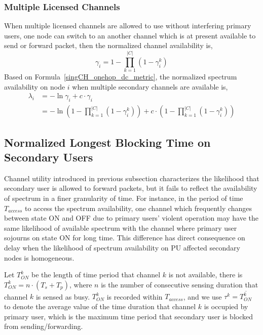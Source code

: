\subsubsection{Multiple Licensed Channels}
When multiple licensed channels are allowed to use without interfering primary users, one node can switch to an another channel which is at present available to send or forward packet, then the normalized channel availability is,
\begin{equation}
\gamma_i = 1-\prod_{k=1}^{|C|} (1-\gamma_i^k)
\label{gamma_multichannel}
\end{equation} 
Based on Formula~\ref{singCH_onehop_dc_metric}, the normalized spectrum availability on node $i$ when multiple secondary channels are available is,
\begin{equation}
\label{mulCH_onehop_dc_metric}
\begin{aligned}
\lambda_i & = -\ln \gamma_i+ c \cdot \gamma_i\\
		&= -\ln(1-\prod_{k=1}^{|C|}(1-\gamma_i^k)) + c \cdot (1-\prod_{k=1}^{|C|}(1-\gamma_i^k))
\end{aligned}
\end{equation}


\subsection{Normalized Longest Blocking Time on Secondary Users}
\label{BT}
Channel utility introduced in previous subsection characterizes the likelihood that secondary user is allowed to forward packets, but it fails to reflect the availability of spectrum in a finer granularity of time.
For instance, in the period of time $T_{access}$ to access the spectrum availability, one channel which frequently changes between state ON and OFF due to primary users' violent operation may have the same likelihood of available spectrum with the channel where primary user sojourns on state ON for long time.
This difference has direct consequence on delay when the likelihood of spectrum availability on PU affected secondary nodes is homogeneous.

Let ${T_{ON}^k}$ be the length of time period that channel $k$ is not available, there is ${T_{ON}^k} = n\cdot (T_s+T_p)$, where $n$ is the number of consecutive sensing duration that channel $k$ is sensed as busy.
${T_{ON}^k}$ is recorded within $T_{access}$, and we use $\tau^k = \overline {T_{ON}^k}$ to denote the average value of the time duration that channel $k$ is occupied by primary user, which is the maximum time period that secondary user is blocked from sending/forwarding.

